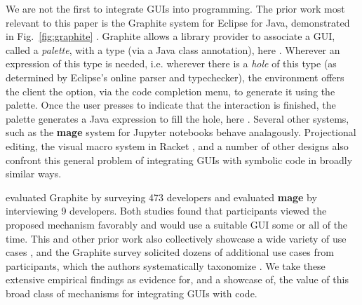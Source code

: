 We are not the first to integrate GUIs
into programming.
The prior work most relevant to this paper is the {Graphite} system for Eclipse for Java,
demonstrated in Fig.~\ref{fig:graphite} \cite{Graphite}.
Graphite allows a library provider to associate a GUI, called a \emph{palette}, with a type
(via a Java class annotation), here .
Wherever an expression of this type is needed,
i.e. wherever there is a \emph{hole} of this type
(as determined by Eclipse's online parser and typechecker),
the environment offers the client the option, via the code completion menu,
to generate it using the palette.
Once the user presses  to indicate that the
interaction is finished, the palette generates a
Java expression to fill the hole, here .
Several other systems, such as the
\textbf{mage} system for Jupyter notebooks \cite{DBLP:conf/uist/KeryRHMWP20}
behave analagously.
Projectional editing, the visual macro system in Racket \cite{interactive-visual-syntax}, and a number of other designs
also confront this general problem of integrating GUIs with symbolic code
in broadly similar ways.

\citet{Graphite} evaluated Graphite by surveying 473 developers
and \citet{DBLP:conf/uist/KeryRHMWP20} evaluated \textbf{mage} by interviewing 9 developers.
Both studies found that
participants viewed the proposed mechanism favorably and
would use a suitable GUI some or all of the time.
This and other prior work also collectively showcase a wide variety of use cases \cite{Graphite,DBLP:conf/uist/KeryRHMWP20,interactive-visual-syntax},
and the Graphite survey solicited dozens of additional use cases from participants,
which the authors systematically taxonomize \cite{Graphite}.
We take these extensive empirical findings
as evidence for, and a showcase of,
the value of this broad class of mechanisms for integrating GUIs with code.
\vspace{-1mm}
